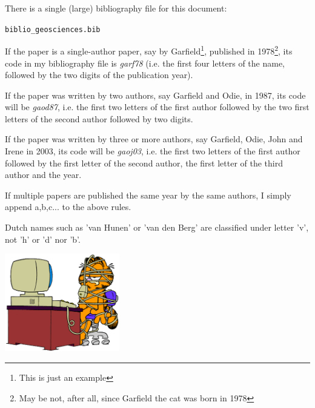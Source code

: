 There is a single (large) bibliography file for this document:
\begin{center}
{\tt biblio\_geosciences.bib}
\end{center}

If the paper is a single-author paper, say by Garfield\footnote{This is just an example}, 
published in 1978\footnote{May be not, after all, since Garfield the cat was born in 1978}, its code 
in my bibliography file is {\sl garf78} (i.e. the first four letters of the name, followed by 
the two digits of the publication year).

If the paper was written by two authors, say Garfield and Odie, in 1987, its code 
will be {\sl gaod87}, i.e. the first two letters of the first author followed by the two 
first letters of the second author followed by two digits.

If the paper was written by three or more authors, say Garfield, Odie, John and Irene in 
2003, its code will be {\sl gaoj03}, i.e. the first two letters of the first author followed 
by the first letter of the second author, the first letter of the third author and the year.

If multiple papers are published the same year by the same authors, I simply append a,b,c... to the 
above rules. 

\begin{remark} Dutch names such as 'van Hunen' or 'van den Berg' are classified under letter 'v', 
not 'h' or 'd' nor 'b'. 
\end{remark}

\vspace{1cm}

\begin{center}
\includegraphics[width=5cm]{images/garfield-computer}
\end{center}
